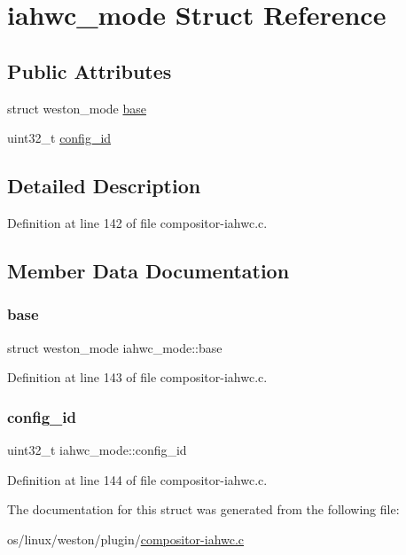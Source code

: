 \hypertarget{structiahwc__mode}{}\section{iahwc\+\_\+mode Struct Reference}
\label{structiahwc__mode}
\subsection*{Public Attributes}
\begin{DoxyCompactItemize}
\item 
struct weston\+\_\+mode \mbox{\hyperlink{structiahwc__mode_ab04ed41f29ad4c89b11120c9db01a93c}{base}}
\item 
uint32\+\_\+t \mbox{\hyperlink{structiahwc__mode_a38ce4032966c7348a378c1eb1a04113a}{config\+\_\+id}}
\end{DoxyCompactItemize}


\subsection{Detailed Description}


Definition at line 142 of file compositor-\/iahwc.\+c.



\subsection{Member Data Documentation}
\mbox{\label{structiahwc__mode_ab04ed41f29ad4c89b11120c9db01a93c}} 
\subsubsection{\texorpdfstring{base}{base}}
{\footnotesize\ttfamily struct weston\+\_\+mode iahwc\+\_\+mode\+::base}



Definition at line 143 of file compositor-\/iahwc.\+c.

\mbox{\label{structiahwc__mode_a38ce4032966c7348a378c1eb1a04113a}} 
\subsubsection{\texorpdfstring{config\+\_\+id}{config\_id}}
{\footnotesize\ttfamily uint32\+\_\+t iahwc\+\_\+mode\+::config\+\_\+id}



Definition at line 144 of file compositor-\/iahwc.\+c.



The documentation for this struct was generated from the following file\+:\begin{DoxyCompactItemize}
\item 
os/linux/weston/plugin/\mbox{\hyperlink{compositor-iahwc_8c}{compositor-\/iahwc.\+c}}\end{DoxyCompactItemize}
